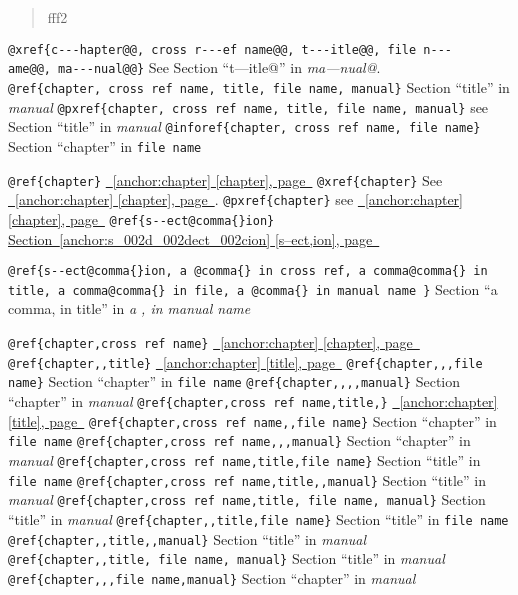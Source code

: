 \documentclass{book}
\begin{document}
\begin{titlepage}
%
\begin{quote}
\unskip{\parskip=0pt\noindent}%
fff2
\end{quote}


\texttt{@xref\{c{-}{-}{-}hapter@@,\ cross r{-}{-}{-}ef name@@,\ t{-}{-}{-}itle@@,\ file n{-}{-}{-}ame@@,\ ma{-}{-}{-}nual@@\}} See Section ``t---itle@'' in \textsl{ma---nual@}.
\texttt{@ref\{chapter,\ cross ref name,\ title,\ file name,\ manual\}} Section ``title'' in \textsl{manual}
\texttt{@pxref\{chapter,\ cross ref name,\ title,\ file name,\ manual\}} see Section ``title'' in \textsl{manual}
\texttt{@inforef\{chapter,\ cross ref name,\ file name\}} Section ``chapter'' in \texttt{file name}

\texttt{@ref\{chapter\}} \hyperref[anchor:chapter]{\chaptername~\ref*{anchor:chapter} [chapter], page~\pageref*{anchor:chapter}}
\texttt{@xref\{chapter\}} See \hyperref[anchor:chapter]{\chaptername~\ref*{anchor:chapter} [chapter], page~\pageref*{anchor:chapter}}.
\texttt{@pxref\{chapter\}} see \hyperref[anchor:chapter]{\chaptername~\ref*{anchor:chapter} [chapter], page~\pageref*{anchor:chapter}}
\texttt{@ref\{s{-}{-}ect@comma\{\}ion\}} \hyperref[anchor:s_002d_002dect_002cion]{Section~\ref*{anchor:s_002d_002dect_002cion} [s--ect,ion], page~\pageref*{anchor:s_002d_002dect_002cion}}

\texttt{@ref\{s{-}{-}ect@comma\{\}ion,\ a @comma\{\} in cross
ref,\ a comma@comma\{\} in title,\ a comma@comma\{\} in file,\ a @comma\{\} in manual name \}}
Section ``a comma, in title'' in \textsl{a , in manual name}

\texttt{@ref\{chapter,cross ref name\}} \hyperref[anchor:chapter]{\chaptername~\ref*{anchor:chapter} [chapter], page~\pageref*{anchor:chapter}}
\texttt{@ref\{chapter{,}{,}title\}} \hyperref[anchor:chapter]{\chaptername~\ref*{anchor:chapter} [title], page~\pageref*{anchor:chapter}}
\texttt{@ref\{chapter{,}{,},file name\}} Section ``chapter'' in \texttt{file name}
\texttt{@ref\{chapter{,}{,}{,}{,}manual\}} Section ``chapter'' in \textsl{manual}
\texttt{@ref\{chapter,cross ref name,title,\}} \hyperref[anchor:chapter]{\chaptername~\ref*{anchor:chapter} [title], page~\pageref*{anchor:chapter}}
\texttt{@ref\{chapter,cross ref name{,}{,}file name\}} Section ``chapter'' in \texttt{file name}
\texttt{@ref\{chapter,cross ref name{,}{,},manual\}} Section ``chapter'' in \textsl{manual}
\texttt{@ref\{chapter,cross ref name,title,file name\}} Section ``title'' in \texttt{file name}
\texttt{@ref\{chapter,cross ref name,title{,}{,}manual\}} Section ``title'' in \textsl{manual}
\texttt{@ref\{chapter,cross ref name,title,\ file name,\ manual\}} Section ``title'' in \textsl{manual}
\texttt{@ref\{chapter{,}{,}title,file name\}} Section ``title'' in \texttt{file name}
\texttt{@ref\{chapter{,}{,}title{,}{,}manual\}} Section ``title'' in \textsl{manual}
\texttt{@ref\{chapter{,}{,}title,\ file name,\ manual\}} Section ``title'' in \textsl{manual}
\texttt{@ref\{chapter{,}{,},file name,manual\}} Section ``chapter'' in \textsl{manual}



\end{titlepage}
\end{document}
